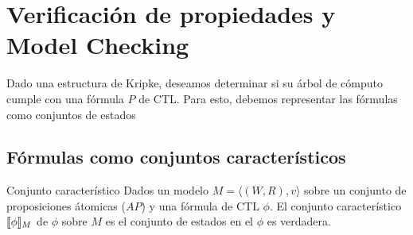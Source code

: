 \section{Verificación de propiedades y Model Checking}
Dado una estructura de Kripke, deseamos determinar si su árbol de cómputo cumple con una fórmula $P$ de CTL. Para esto, debemos representar las fórmulas como conjuntos de estados

\subsection{Fórmulas como conjuntos característicos}
\begin{definicion}{Conjunto característico}
Dados un modelo $M = \langle(W,R), v\rangle$ sobre un conjunto de proposiciones átomicas ($AP$) y una fórmula de CTL $\phi$. El conjunto característico $\llbracket \phi \rrbracket_{M}$ de $\phi$ sobre $M$ es el conjunto de estados en el $\phi$ es verdadera.
\end{definicion}


